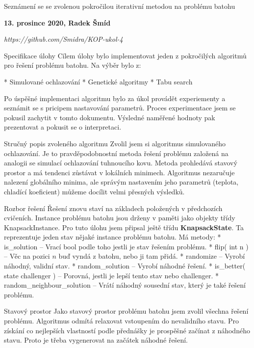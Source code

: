
\chyph

\tit Seznámení se se zvolenou pokročilou iterativní metodou na problému batohu
\centerline{\bf 13. prosince 2020, Radek Šmíd}
\medskip
\centerline{\it https://github.com/Smidra/KOP-ukol-4}


\sec Specifikace úlohy
Cílem úlohy bylo implementovat jeden z pokročilých algoritmů pro řešení problému batohu.\break
Na výběr bylo z:

\begitems
* Simulované ochlazování
* Genetické algoritmy
* Tabu search
\enditems

Po úspěšné implementaci algoritmu bylo za úkol provádět experiementy a seznámit se s pricipem nastavování parametrů. Proces experimentace jsem se pokusil zachytit v tomto dokumentu. Výsledné naměřené hodnoty pak prezentovat a pokusit se o interpretaci.


\sec Stručný popis zvoleného algoritmu
Zvolil jsem si algoritmus simulovaného ochlazování. Je to pravděpodobnostní metoda řešení problému založená na analogii se simulací ochlazování tuhnoucího kovu. Metoda prohledává stavový prostor a má tendenci zůstávat v lokálních minimech. Algoritmus nezaručuje nalezení globálního minima, ale správým nastavením jeho parametrů (teplota, chladící koeficient) můžeme docílit velmi přesných výsledků.


\sec Rozbor řešení
Řešení znovu staví na základech položených v předchozích cvičeních. Instance problému batohu jsou drženy v paměti jako objekty třídy KnapsackInstance. Pro tuto úlohu jsem připsal ještě třídu {\bf KnapsackState}. Ta reprezentuje jeden stav nějaké instance problému batohu. Má metody:
\begitems
* is\_solution -- Vrací bool podle toho jestli je stav řešením problému.
* flip( int n ) -- Věc na pozici $n$ buď vyndá z batohu, nebo ji tam přidá.
* randomize -- Vyrobí náhodný, validní stav.
* random\_solution -- Vyrobí náhodné řešení.
* is\_better( state challenger ) -- Porovná, jestli je lepší tento stav nebo challenger.
* random\_neighbour\_solution -- Vrátí náhodný sousední stav, který je také řešení problému.
\enditems

\secc Stavový prostor
Jako stavový prostor problému batohu jsem zvolil všechna řešení problému. Algoritmus odmítá relaxovat vstoupením do nevalidního stavu. Pro získání co nejlepších vlastností podle přednášky je prospěšné začínat z náhodného stavu. Proto je třeba vygenerovat na začátek náhodné řešení.

